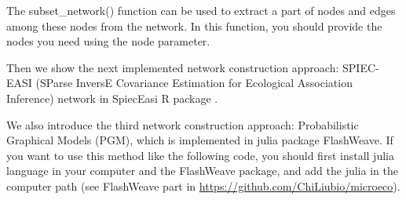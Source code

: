 \documentclass[
]{book}
\newenvironment{Shaded}{\begin{snugshade}}{\end{snugshade}}
\newcommand{\AttributeTok}[1]{\textcolor[rgb]{0.77,0.63,0.00}{#1}}
\newcommand{\CommentTok}[1]{\textcolor[rgb]{0.56,0.35,0.01}{\textit{#1}}}
\newcommand{\ConstantTok}[1]{\textcolor[rgb]{0.00,0.00,0.00}{#1}}
\newcommand{\FloatTok}[1]{\textcolor[rgb]{0.00,0.00,0.81}{#1}}
\newcommand{\FunctionTok}[1]{\textcolor[rgb]{0.00,0.00,0.00}{#1}}
\newcommand{\NormalTok}[1]{#1}
\newcommand{\OtherTok}[1]{\textcolor[rgb]{0.56,0.35,0.01}{#1}}
\newcommand{\SpecialCharTok}[1]{\textcolor[rgb]{0.00,0.00,0.00}{#1}}
\newcommand{\StringTok}[1]{\textcolor[rgb]{0.31,0.60,0.02}{#1}}
\begin{document}
The subset\_network() function can be used to extract a part of nodes and edges among these nodes from the network.
In this function, you should provide the nodes you need using the node parameter.

\begin{Shaded}
\end{Shaded}

Then we show the next implemented network construction approach:
SPIEC-EASI (SParse InversE Covariance Estimation for Ecological Association Inference) network in SpiecEasi R package \citep{Kurtz_Sparse_2015}.

\begin{Shaded}
\end{Shaded}

We also introduce the third network construction approach: Probabilistic Graphical Models (PGM), which is implemented in julia package FlashWeave\citep{Tackmann_Rapid_2019}.
If you want to use this method like the following code, you should first install julia language in your computer and the FlashWeave package,
and add the julia in the computer path (see FlashWeave part in \url{https://github.com/ChiLiubio/microeco}).
\end{document}
